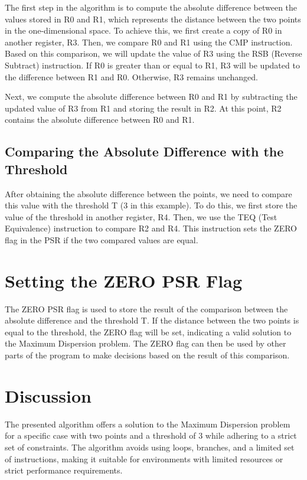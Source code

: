 The first step in the algorithm is to compute the absolute difference between the values stored in R0 and R1, which represents the distance between the two points in the one-dimensional space. To achieve this, we first create a copy of R0 in another register, R3. Then, we compare R0 and R1 using the CMP instruction. Based on this comparison, we will update the value of R3 using the RSB (Reverse Subtract) instruction. If R0 is greater than or equal to R1, R3 will be updated to the difference between R1 and R0. Otherwise, R3 remains unchanged.

Next, we compute the absolute difference between R0 and R1 by subtracting the updated value of R3 from R1 and storing the result in R2. At this point, R2 contains the absolute difference between R0 and R1.

\subsection{Comparing the Absolute Difference with the Threshold}

After obtaining the absolute difference between the points, we need to compare this value with the threshold T (3 in this example). To do this, we first store the value of the threshold in another register, R4. Then, we use the TEQ (Test Equivalence) instruction to compare R2 and R4. This instruction sets the ZERO flag in the PSR if the two compared values are equal.

\section{Setting the ZERO PSR Flag}

The ZERO PSR flag is used to store the result of the comparison between the absolute difference and the threshold T. If the distance between the two points is equal to the threshold, the ZERO flag will be set, indicating a valid solution to the Maximum Dispersion problem. The ZERO flag can then be used by other parts of the program to make decisions based on the result of this comparison.

\section{Discussion}

The presented algorithm offers a solution to the Maximum Dispersion problem for a specific case with two points and a threshold of 3 while adhering to a strict set of constraints. The algorithm avoids using loops, branches, and a limited set of instructions, making it suitable for environments with limited resources or strict performance requirements.

